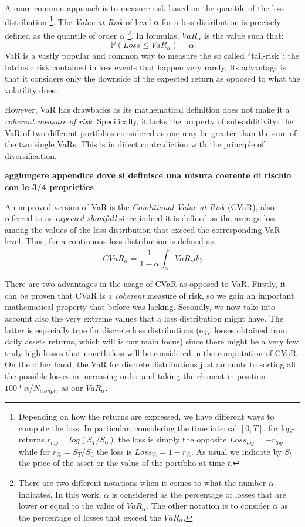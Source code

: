A more common approach is to measure risk based on the quantile of the loss distribution \footnote{Depending on how the returns are expressed, we have different ways to compute the loss. In particular, considering the time interval $[0, T]$, for log-returns $r_{log}=log(S_T/S_0)$ the loss is simply the opposite $Loss_{log} = - r_{log}$ while for $r_\% = S_T/S_0$  the loss is $Loss_\% = 1 - r_\%$. As usual we indicate by $S_t$ the price  of the asset or the value of the portfolio at time $t$.}. The \textit{Value-at-Risk} of level $\alpha$ for a loss distribution is precisely defined as the quantile of order $\alpha$ \footnote{ There are two different notations when it comes to what the number $\alpha$ indicates. In this work, $\alpha$ is considered as the percentage of losses that are lower or equal to the value of $VaR_\alpha$. The other notation is to consider $\alpha$ as the percentage of losses that exceed the $VaR_\alpha$. }.  In formulas, $VaR_\alpha$ is the value such that:
\begin{equation}
\mathbb{P}(Loss \leq VaR_\alpha) = \alpha
\end{equation}
VaR is a vastly popular and common way to measure the so called ``tail-risk'': the intrinsic risk contained in loss events that happen very rarely. 
Its advantage is that it considers only the downside of the expected return as opposed to what the volatility does.

However, VaR has drawbacks as its mathematical definition does not make it a \textit{coherent measure of risk}. Specifically, it lacks the property of sub-additivity: the VaR of two different portfolios  considered as one may be greater than the sum of the two single VaRs. This is in direct contradiction with the principle of diversification.

\textbf{aggiungere appendice dove si definisce una misura coerente di rischio con le 3/4 proprieties}

An improved version of VaR is the \textit{Conditional Value-at-Risk} (CVaR), also referred to as \textit{expected shortfall} since indeed it is defined as the average loss among the values of the loss distribution that exceed the corresponding VaR level. Thus, for a continuous loss distribution is defined as:
\begin{equation}
	CVaR_\alpha = \frac{1}{1-\alpha} \int_{\alpha}^{1} VaR_\gamma d\gamma 
\end{equation}

There are two advantages in the usage of CVaR as opposed to VaR. Firstly, it can be proven that CVaR is a \textit{coherent} measure of risk, so we gain an important mathematical property that before was lacking. Secondly, we now take into account also the very extreme values that a loss distribution might have. The latter is especially true for discrete loss distributions (e.g. losses obtained from daily assets returns, which will is our main focus) since there might be a very few  truly high losses that nonetheless will be considered in the computation of CVaR. On the other hand, the VaR for discrete distributions just amounts to sorting all the possible losses in increasing order and taking the element in position $100*\alpha / N_{sample}$ as our $VaR_\alpha$. 


